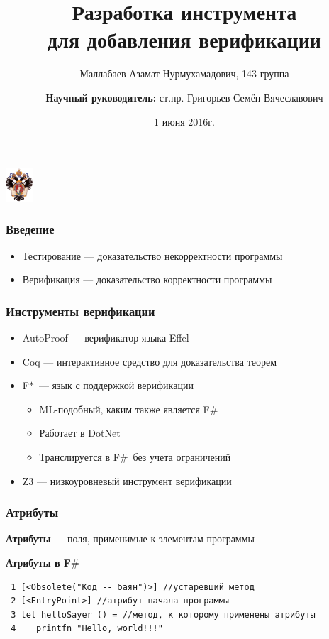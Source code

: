 \documentclass{beamer}
\title[Верификация в коде]{Разработка инструмента\\
        для добавления верификации}
\institute[СПбГУ]{
Санкт-Петербургский государственный университет } %
\author[Маллабаев Азамат]{Маллабаев Азамат Нурмухамадович, 143 группа \\
  \and
    {\bfseries Научный руководитель:} ст.пр. Григорьев Семён Вячеславович}
\date{1 июня 2016г.}
\def \fstar {F$\ast$}
\def \fsharp {F$\#$}
\begin{document}
{
\begin{frame}
  \begin{center}
  {\includegraphics[width=1cm]{pictures/SPbGU_Logo.png}}
  \end{center}
  \titlepage
\end{frame}
}
            
\begin{frame}
  \transwipe[direction=90]
  \frametitle{Введение}
  \begin{itemize}
    \item Тестирование --- доказательство некорректности программы
    \item Верификация --- доказательство корректности программы
  \end{itemize}
\end{frame}

\begin{frame}
  \transwipe[direction=90]
  \frametitle{Инструменты верификации}
  \begin{itemize}
    \item AutoProof --- верификатор языка Effel
    \item Coq --- интерактивное средство для доказательства теорем
    \item \fstar~--- язык с поддержкой верификации
    \begin{itemize}
      \item ML-подобный, каким также является \fsharp
      \item Работает в DotNet
      \item Транслируется в \fsharp~без учета ограничений
    \end{itemize}
    \item Z3 --- низкоуровневый инструмент верификации
  \end{itemize}
\end{frame}

\begin{frame}[fragile]
  \transwipe[direction=90]
  \frametitle{Атрибуты}
  \textbf {Атрибуты} --- поля, применимые к элементам программы
  
  \textbf {}
  
  \textbf{Атрибуты в \fsharp}
  \begin{verbatim}
 1 [<Obsolete("Код -- баян")>] //устаревший метод
 2 [<EntryPoint>] //атрибут начала программы
 3 let helloSayer () = //метод, к которому применены атрибуты
 4    printfn "Hello, world!!!"
  \end{verbatim}
\end{frame}
\end{document}
